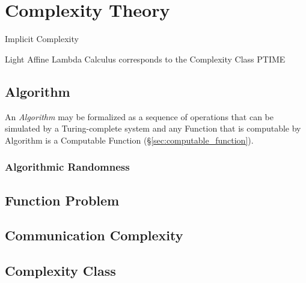 \section{Complexity Theory}\label{sec:complexity_theory}

Implicit Complexity

Light Affine Lambda Calculus corresponds to the Complexity Class PTIME



\subsection{Algorithm}\label{sec:algorithm}

An \emph{Algorithm} may be formalized as a sequence of operations that
can be simulated by a Turing-complete system and any Function that is
computable by Algorithm is a Computable Function
(\S\ref{sec:computable_function}).



\subsubsection{Algorithmic Randomness}\label{sec:algorithmic_randomness}



\subsection{Function Problem}\label{sec:function_problem}

\subsection{Communication Complexity}\label{sec:communication_complexity}

\subsection{Complexity Class}\label{sec:complexity_class}

